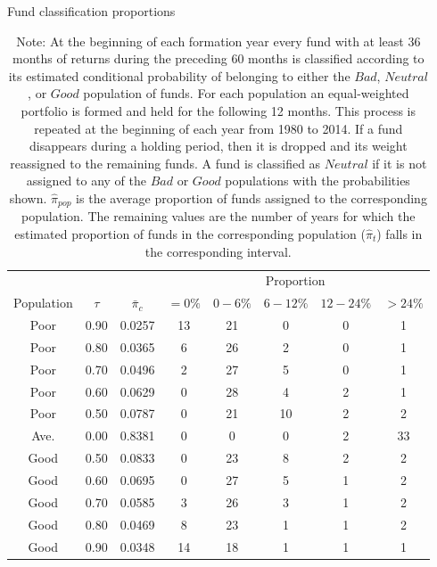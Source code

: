 \begin{table}[t]
\centering
\small
\captionsetup{labelsep=colon, font=footnotesize, justification=centerfirst}
\caption{Fund classification proportions}
\begin{tabular}{*{8}{c}}
\toprule
& & &\multicolumn{5}{c}{Proportion} \\
\cmidrule{4-8}
Population & $\tau$ & $\bar{\pi}_c$ & $=0\%$ & $0-6\%$ & $6-12\%$ & $12-24\%$ & $>24\%$ \\
\midrule
Poor & 0.90 & 0.0257 &    13 &    21 &     0 &     0 &     1 \\
Poor & 0.80 & 0.0365 &     6 &    26 &     2 &     0 &     1 \\
Poor & 0.70 & 0.0496 &     2 &    27 &     5 &     0 &     1 \\
Poor & 0.60 & 0.0629 &     0 &    28 &     4 &     2 &     1 \\
Poor & 0.50 & 0.0787 &     0 &    21 &    10 &     2 &     2 \\
Ave. & 0.00 & 0.8381 &     0 &     0 &     0 &     2 &    33 \\
Good & 0.50 & 0.0833 &     0 &    23 &     8 &     2 &     2 \\
Good & 0.60 & 0.0695 &     0 &    27 &     5 &     1 &     2 \\
Good & 0.70 & 0.0585 &     3 &    26 &     3 &     1 &     2 \\
Good & 0.80 & 0.0469 &     8 &    23 &     1 &     1 &     2 \\
Good & 0.90 & 0.0348 &    14 &    18 &     1 &     1 &     1 \\
\bottomrule
\end{tabular}
\captionsetup{position=below, font=footnotesize, justification=justified, width=0.70\linewidth}
\caption*{Note: At the beginning of each formation year every fund with at least 36 months of returns during the preceding 60 months is classified according to its estimated conditional probability of belonging to either the $Bad$, $Neutral$, or $Good$ population of funds.  For each population an equal-weighted portfolio is formed and held for the following 12 months.  This process is repeated at the beginning of each year from 1980 to 2014.  If a fund disappears during a holding period, then it is dropped and its weight reassigned to the remaining funds.  A fund is classified as $Neutral$ if it is not assigned to any of the $Bad$ or $Good$ populations with the probabilities shown. $\hat{\pi}_{pop}$ is the average proportion of funds assigned to the corresponding population.  The remaining values are the number of years for which the estimated proportion of funds in the corresponding population ($\hat{\pi}_t$) falls in the corresponding interval.}
\label{tab:proportions}
\end{table}

